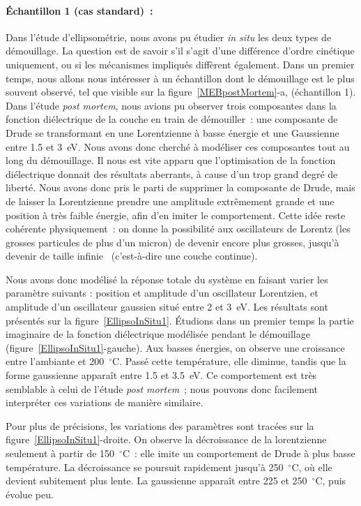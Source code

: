\paragraph{Échantillon 1 (cas standard)~:}
Dans l'étude d'ellipsométrie, nous avons pu étudier \textit{in situ} les deux types de démouillage. La question est de savoir s'il s'agit d'une différence d'ordre cinétique uniquement, ou si les mécanismes impliqués diffèrent également. Dans un premier temps, nous allons nous intéresser à un échantillon dont le démouillage est le plus souvent observé, tel que visible sur la figure~\ref{MEBpostMortem}-a, (échantillon 1). Dans l'étude \textit{post mortem}, nous avions pu observer trois composantes dans la fonction diélectrique de la couche en train de démouiller~: une composante de Drude se transformant en une Lorentzienne à basse énergie et une Gaussienne entre 1.5 et 3~eV. Nous avons donc cherché à modéliser ces composantes tout au long du démouillage. Il nous est vite apparu que l'optimisation de la fonction diélectrique donnait des résultats aberrants, à cause d'un trop grand degré de liberté. Nous avons donc pris le parti de supprimer la composante de Drude, mais de laisser la Lorentzienne prendre une amplitude extrêmement grande et une position à très faible énergie, afin d'en imiter le comportement. Cette idée reste cohérente physiquement~: on donne la possibilité aux oscillateurs de Lorentz (les grosses particules de plus d'un micron) de devenir encore plus grosses, jusqu'à devenir de taille \og infinie \fg{}~(c'est-à-dire une couche continue).\par
Nous avons donc modélisé la réponse totale du système en faisant varier les paramètre suivants : position et amplitude d'un oscillateur Lorentzien, et amplitude d'un oscillateur gaussien situé entre 2 et 3~eV. Les résultats sont présentés sur la figure~\ref{EllipsoInSitu1}. Étudions dans un premier temps la partie imaginaire de la fonction diélectrique modélisée pendant le démouillage (figure~\ref{EllipsoInSitu1}-gauche). Aux basses énergies, on observe une croissance entre l'ambiante et 200~$^\circ$C. Passé cette température, elle diminue, tandis que la forme gaussienne apparaît entre 1.5 et 3.5~eV. Ce comportement est très semblable à celui de l'étude \textit{post mortem}~; nous pouvons donc facilement interpréter ces variations de manière similaire.\par
Pour plus de précisions, les variations des paramètres sont tracées sur la figure~\ref{EllipsoInSitu1}-droite. On observe la décroissance de la lorentzienne seulement à partir de 150~$^\circ$C~: elle imite un comportement de Drude à plus basse température. La décroissance se poursuit rapidement jusqu'à 250~$^\circ$C, où elle devient subitement plus lente. La gaussienne apparaît entre 225 et 250~$^\circ$C, puis évolue peu.\par

